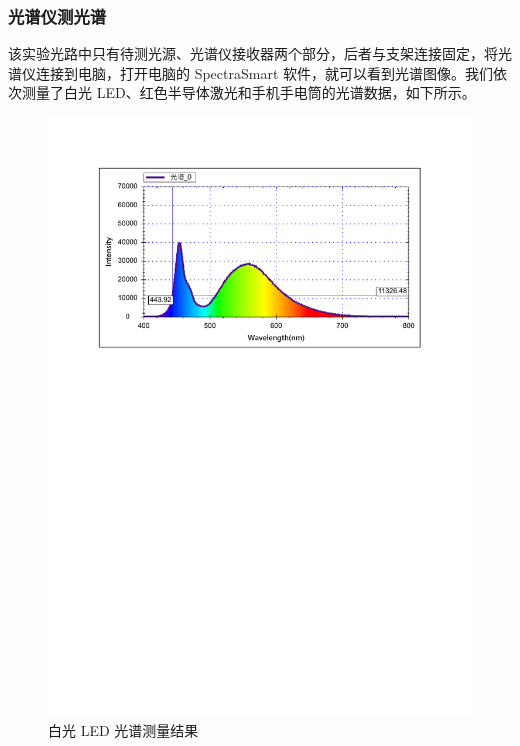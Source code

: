 \documentclass[UTF8]{article}
\theoremstyle{MyLineTheoremStyle} %
\theoremstyle{MyBlockTheoremStyle} %
\theoremstyle{MySubsubsectionStyle} %
\begin{document}
\subsubsection{光谱仪测光谱}

该实验光路中只有待测光源、光谱仪接收器两个部分，后者与支架连接固定，将光谱仪连接到电脑，打开电脑的 SpectraSmart 软件，就可以看到光谱图像。我们依次测量了白光 LED、红色半导体激光和手机手电筒的光谱数据，如下所示。

\begin{figure}[H]\centering
    \includegraphics[width=\columnwidth]{assets/5 光谱仪/白光 LED.pdf}
    \caption{白光 LED 光谱测量结果}
\end{figure}
\end{document}
